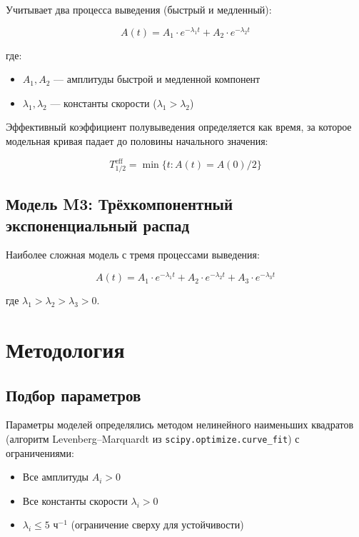 \documentclass[12pt,a4paper]{article}
\begin{document}
Учитывает два процесса выведения (быстрый и медленный):

\begin{equation}
A(t) = A_1 \cdot e^{-\lambda_1 t} + A_2 \cdot e^{-\lambda_2 t}
\end{equation}

где:
\begin{itemize}
    \item $A_1, A_2$ — амплитуды быстрой и медленной компонент
    \item $\lambda_1, \lambda_2$ — константы скорости ($\lambda_1 > \lambda_2$)
\end{itemize}

Эффективный коэффициент полувыведения определяется как время, за которое 
модельная кривая падает до половины начального значения:

\begin{equation}
T_{1/2}^{\text{eff}} = \min\{t : A(t) = A(0)/2\}
\end{equation}

\subsection{Модель M3: Трёхкомпонентный экспоненциальный распад}

Наиболее сложная модель с тремя процессами выведения:

\begin{equation}
A(t) = A_1 \cdot e^{-\lambda_1 t} + A_2 \cdot e^{-\lambda_2 t} + A_3 \cdot e^{-\lambda_3 t}
\end{equation}

где $\lambda_1 > \lambda_2 > \lambda_3 > 0$.

\section{Методология}

\subsection{Подбор параметров}

Параметры моделей определялись методом нелинейного наименьших квадратов 
(алгоритм Levenberg--Marquardt из \texttt{scipy.optimize.curve\_fit}) с ограничениями:
\begin{itemize}
    \item Все амплитуды $A_i > 0$
    \item Все константы скорости $\lambda_i > 0$
    \item $\lambda_i \leq 5$ ч$^{-1}$ (ограничение сверху для устойчивости)
\end{itemize}
\end{document}
